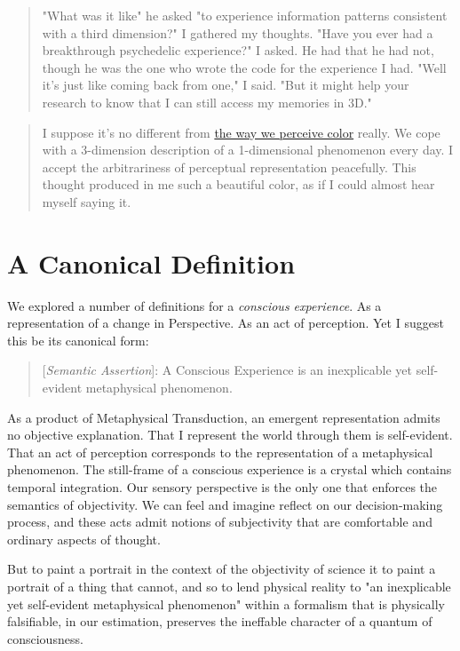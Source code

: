 \documentclass[runningheads]{llncs}
\newcommand{\lib}[2]{\href{https://dna-platform.github.io/inexplicable-phenomena#1}{#2}\xspace}
\begin{document}
\begin{quote}
"What was it like" he asked "to experience information patterns consistent with a third dimension?" I gathered my thoughts. "Have you ever had a breakthrough psychedelic experience?" I asked. He had that he had not, though he was the one who wrote the code for the experience I had. "Well it's just like coming back from one," I said. "But it might help your research to know that I can still access my memories in 3D."
\end{quote}

\begin{quote}
I suppose it's no different from \lib{/a-novel-perspective/a-novel-perspective.html}{the way we perceive color} really. We cope with a 3-dimension description of a 1-dimensional phenomenon every day. I accept the arbitrariness of perceptual representation peacefully. This thought produced in me such a beautiful color, as if I could almost hear myself saying it.
\end{quote}

\section{A Canonical Definition}

We explored a number of definitions for a \emph{conscious experience}. As a representation of a change in Perspective. As an act of perception. Yet I suggest this be its canonical form:

\begin{quote}
[\emph{Semantic Assertion}]: A Conscious Experience is an inexplicable yet self-evident metaphysical phenomenon.
\end{quote}

As a product of Metaphysical Transduction, an emergent representation admits no objective explanation. That I represent the world through them is self-evident. That an act of perception corresponds to the representation of a metaphysical phenomenon. The still-frame of a conscious experience is a crystal which contains temporal integration. Our sensory perspective is the only one that enforces the semantics of objectivity. We can feel and imagine reflect on our decision-making process, and these acts admit notions of subjectivity that are comfortable and ordinary aspects of thought.

But to paint a portrait in the context of the objectivity of science it to paint a portrait of a thing that cannot, and so to lend physical reality to "an inexplicable yet self-evident metaphysical phenomenon" within a formalism that is physically falsifiable, in our estimation, preserves the ineffable character of a quantum of consciousness.
\end{document}
